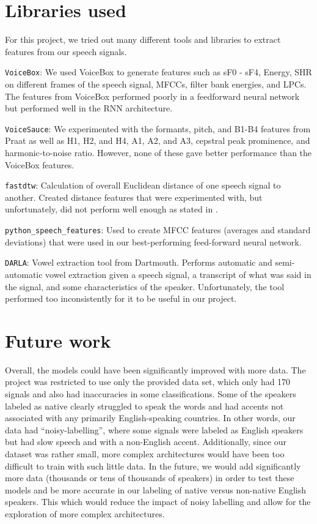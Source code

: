 \documentclass{article}
\begin{document}
\section{Libraries used}
\label{sec:libraries}

For this project, we tried out many different tools and libraries to extract features from our speech signals.

\texttt{VoiceBox}: We used VoiceBox to generate features such as sF0 - sF4, Energy, SHR on different frames of the speech signal, MFCCs, filter bank energies, and LPCs.
The features from VoiceBox performed poorly in a  feedforward neural network but performed well in the RNN architecture.

\texttt{VoiceSauce}: We experimented with the formants, pitch, and B1-B4 features from Praat as well as H1, H2, and H4, A1, A2, and A3, cepstral peak prominence, and harmonic-to-noise ratio.
However, none of these gave better performance than the VoiceBox features.

\texttt{fastdtw}: Calculation of overall Euclidean distance of one speech signal to another.
Created distance features that were experimented with, but unfortunately, did not perform well enough as stated in .

\texttt{python\_speech\_features}: Used to create MFCC features (averages and standard deviations) that were used in our best-performing feed-forward neural network.

\texttt{DARLA}: Vowel extraction tool from Dartmouth.
Performs automatic and semi-automatic vowel extraction given a speech signal, a transcript of what was said in the signal, and some characteristics of the speaker.
Unfortunately, the tool performed too inconsistently for it to be useful in our project.

\section{Future work}
\label{sec:future}

Overall, the models could have been significantly improved with more data.
The project was restricted to use only the provided data set, which only had 170 signals and also had inaccuracies in some classifications.
Some of the speakers labeled as native clearly struggled to speak the words and had accents not associated with any primarily English-speaking countries.
In other words, our data had “noisy-labelling”, where some signals were labeled as English speakers but had slow speech and with a non-English accent.
Additionally, since our dataset was rather small, more complex architectures would have been too difficult to train with such little data.
In the future, we would add significantly more data (thousands or tens of thousands of speakers) in order to test these models  and be more accurate in our labeling of native versus non-native English speakers.
This which would reduce the impact of noisy labelling and allow for the exploration of more complex architectures.
\end{document}
